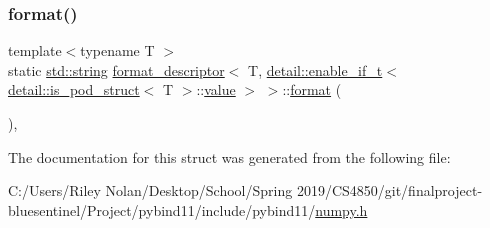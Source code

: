 \subsubsection{\texorpdfstring{format()}{format()}}
{\footnotesize\ttfamily template$<$typename T $>$ \\
static \mbox{\hyperlink{_s_d_l__opengl__glext_8h_ab4ccfaa8ab0e1afaae94dc96ef52dde1}{std\+::string}} \mbox{\hyperlink{structformat__descriptor}{format\+\_\+descriptor}}$<$ T, \mbox{\hyperlink{detail_2common_8h_a012819c9e8b5e04872a271f50f8b8196}{detail\+::enable\+\_\+if\+\_\+t}}$<$ \mbox{\hyperlink{numpy_8h_ae000b26e650bc54d99e9a22109b58515}{detail\+::is\+\_\+pod\+\_\+struct}}$<$ T $>$\+::\mbox{\hyperlink{_s_d_l__opengl__glext_8h_a8ad81492d410ff2ac11f754f4042150f}{value}} $>$ $>$\+::\mbox{\hyperlink{_s_d_l__audio_8h_a71a65ffd977afe9c3fef116a5bc9ee27}{format}} (\begin{DoxyParamCaption}{ }\end{DoxyParamCaption})\hspace{0.3cm}{\ttfamily [inline]}, {\ttfamily [static]}}



The documentation for this struct was generated from the following file\+:\begin{DoxyCompactItemize}
\item 
C\+:/\+Users/\+Riley Nolan/\+Desktop/\+School/\+Spring 2019/\+C\+S4850/git/finalproject-\/bluesentinel/\+Project/pybind11/include/pybind11/\mbox{\hyperlink{numpy_8h}{numpy.\+h}}\end{DoxyCompactItemize}
